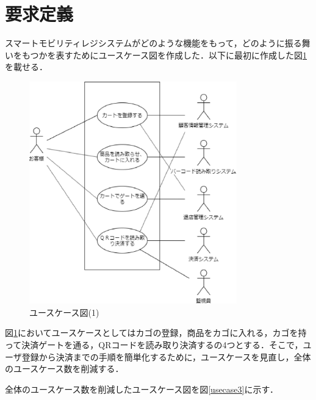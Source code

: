 

\section{要求定義}


スマートモビリティレジシステムがどのような機能をもって，どのように振る舞いをもつかを表すためにユースケース図を作成した．以下に最初に作成した図\ref{usecase1}を載せる．

\begin{figure}[htbp]
\centering
\includegraphics[width = 9cm]{./picture/usecase1.eps}
\caption{ユースケース図(1)}
\label{usecase1}
\end{figure}


図\ref{usecase1}においてユースケースとしてはカゴの登録，商品をカゴに入れる，カゴを持って決済ゲートを通る，QRコードを読み取り決済するの4つとする．そこで，ユーザ登録から決済までの手順を簡単化するために，ユースケースを見直し，全体のユースケース数を削減する．


全体のユースケース数を削減したユースケース図を図\ref{usecase3}に示す．

